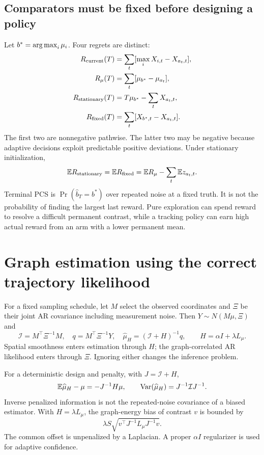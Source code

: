 \subsection{Comparators must be fixed before designing a policy}
Let $b^*=\operatorname*{arg\,max}_i\mu_i$. Four regrets are distinct:
\begin{align}
R_{\rm current}(T)&=\sum_t[\max_iX_{i,t}-X_{a_t,t}],\\
R_\mu(T)&=\sum_t[\mu_{b^*}-\mu_{a_t}],\\
R_{\rm stationary}(T)&=T\mu_{b^*}-\sum_tX_{a_t,t},\\
R_{\rm fixed}(T)&=\sum_t[X_{b^*,t}-X_{a_t,t}].
\end{align}
The first two are nonnegative pathwise. The latter two may be negative because adaptive decisions exploit predictable positive deviations. Under stationary initialization,
\begin{equation}
\mathbb E R_{\rm stationary}=\mathbb E R_{\rm fixed}
=\mathbb E R_\mu-\sum_t\mathbb E z_{a_t,t}.
\end{equation}
Terminal PCS is $\Pr(\widehat b_T=b^*)$ over repeated noise at a fixed truth. It is not the probability of finding the largest last reward. Pure exploration can spend reward to resolve a difficult permanent contrast, while a tracking policy can earn high actual reward from an arm with a lower permanent mean.

\section{Graph estimation using the correct trajectory likelihood}

For a fixed sampling schedule, let $M$ select the observed coordinates and $\Xi$ be their joint AR covariance including measurement noise. Then $Y\sim N(M\mu,\Xi)$ and
\begin{equation}
\mathcal I=M^\top\Xi^{-1}M,\quad q=M^\top\Xi^{-1}Y,\quad
\widehat\mu_H=(\mathcal I+H)^{-1}q,\qquad H=\alpha I+\lambda L_\mu.
\end{equation}
Spatial smoothness enters estimation through $H$; the graph-correlated AR likelihood enters through $\Xi$. Ignoring either changes the inference problem.

For a deterministic design and penalty, with $J=\mathcal I+H$,
\begin{equation}
\mathbb E\widehat\mu_H-\mu=-J^{-1}H\mu,\qquad
\operatorname{Var}(\widehat\mu_H)=J^{-1}\mathcal I J^{-1}.
\end{equation}
Inverse penalized information is not the repeated-noise covariance of a biased estimator. With $H=\lambda L_\mu$, the graph-energy bias of contrast $v$ is bounded by
\begin{equation}
\lambda S\sqrt{v^\top J^{-1}L_\mu J^{-1}v}.
\end{equation}
The common offset is unpenalized by a Laplacian. A proper $\alpha I$ regularizer is used for adaptive confidence.

